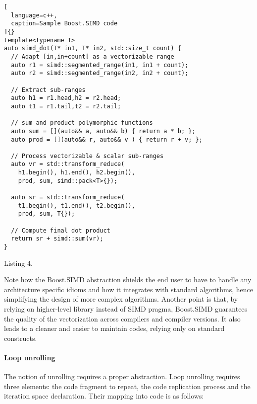 \documentclass[../../main.tex]{subfiles}
\begin{document}
\begin{lstlisting}[
  language=c++,
  caption=Sample Boost.SIMD code
]{}
template<typename T>
auto simd_dot(T* in1, T* in2, std::size_t count) {
  // Adapt [in,in+count[ as a vectorizable range
  auto r1 = simd::segmented_range(in1, in1 + count);
  auto r2 = simd::segmented_range(in2, in2 + count);

  // Extract sub-ranges
  auto h1 = r1.head,h2 = r2.head;
  auto t1 = r1.tail,t2 = r2.tail;

  // sum and product polymorphic functions
  auto sum = [](auto&& a, auto&& b) { return a * b; };
  auto prod = [](auto&& r, auto&& v ) { return r + v; };

  // Process vectorizable & scalar sub-ranges
  auto vr = std::transform_reduce(
    h1.begin(), h1.end(), h2.begin(),
    prod, sum, simd::pack<T>{});

  auto sr = std::transform_reduce(
    t1.begin(), t1.end(), t2.begin(),
    prod, sum, T{});

  // Compute final dot product
  return sr + simd::sum(vr);
}
\end{lstlisting}
Listing 4.

Note how the Boost.SIMD abstraction shields the end
user to have to handle any architecture specific idioms
and how it integrates with standard algorithms, hence
simplifying the design of more complex algorithms.
Another point is that, by relying on higher-level library
instead of SIMD pragma, Boost.SIMD guarantees
the quality of the vectorization across compilers and
compiler versions. It also leads to a cleaner and easier to
maintain codes, relying only on standard \cpp constructs.

\paragraph{Loop unrolling} The notion of unrolling requires
a proper abstraction. Loop unrolling requires three
elements: the code fragment to repeat, the code
replication process and the iteration space declaration.
Their mapping into \cpp code is as follows:
\end{document}
